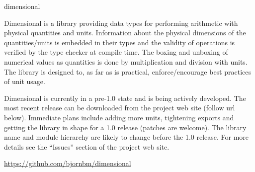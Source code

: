 \begin{hcarentry}[new]{dimensional}
\label{dimensional}
\makeheader

Dimensional is a library providing data types for performing
arithmetic with physical quantities and units. Information about
the physical dimensions of the quantities/units is embedded in their
types and the validity of operations is verified by the type checker
at compile time. The boxing and unboxing of numerical values as
quantities is done by multiplication and division with units. The
library is designed to, as far as is practical, enforce/encourage
best practices of unit usage.

Dimensional is currently in a pre-1.0 state and is being actively
developed. The most recent release can be downloaded from the project
web site (follow url below). Immediate plans include adding more
units, tightening exports and getting the library in shape for a
1.0 release (patches are welcome). The library name and module
hierarchy are likely to change before the 1.0 release. For more
details see the ``Issues'' section of the project web site.

\FurtherReading
 \url{https://github.com/bjornbm/dimensional}
\end{hcarentry}
